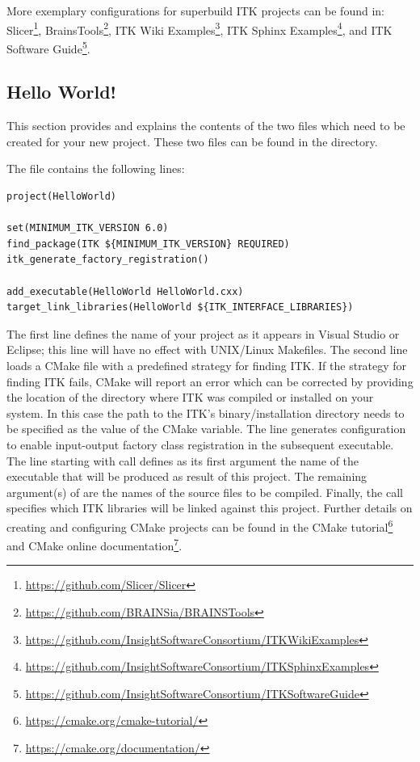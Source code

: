 More exemplary configurations for superbuild ITK projects can be found in:
Slicer\footnote{\url{https://github.com/Slicer/Slicer}},
BrainsTools\footnote{\url{https://github.com/BRAINSia/BRAINSTools}}, ITK Wiki
Examples\footnote{\url{https://github.com/InsightSoftwareConsortium/ITKWikiExamples}},
ITK Sphinx
Examples\footnote{\url{https://github.com/InsightSoftwareConsortium/ITKSphinxExamples}},
and ITK Software
Guide\footnote{\url{https://github.com/InsightSoftwareConsortium/ITKSoftwareGuide}}.

\subsection{Hello World!}%
\label{sec:HelloWorldITK}%

This section provides and explains the contents of the two files which need to
be created for your new project. These two files can be found in the
 directory.

The  file contains the following lines:

\small
\begin{verbatim}
project(HelloWorld)

set(MINIMUM_ITK_VERSION 6.0)
find_package(ITK ${MINIMUM_ITK_VERSION} REQUIRED)
itk_generate_factory_registration()

add_executable(HelloWorld HelloWorld.cxx)
target_link_libraries(HelloWorld ${ITK_INTERFACE_LIBRARIES})
\end{verbatim}
\normalsize

The first line defines the name of your project as it appears in Visual Studio
or Eclipse; this line will have no effect with UNIX/Linux Makefiles. The second
line loads a CMake file with a predefined strategy for finding ITK. If the
strategy for finding ITK fails, CMake will report an error which can be
corrected by providing the location of the directory where ITK was compiled or
installed on your system. In this case the path to the ITK's binary/installation
directory needs to be specified as the value of the  CMake
variable. The line  generates configuration
to enable input-output factory class registration in the subsequent executable.
The line starting with  call defines
as its first argument the name of the executable that will be produced
as result of this project. The remaining argument(s) of 
are the names of the source files to be compiled. Finally, the
 call specifies which ITK libraries will be
linked against this project. Further details on creating and configuring CMake
projects can be found in the CMake tutorial\footnote{
\url{https://cmake.org/cmake-tutorial/}} and CMake online
documentation\footnote{\url{https://cmake.org/documentation/}}.

